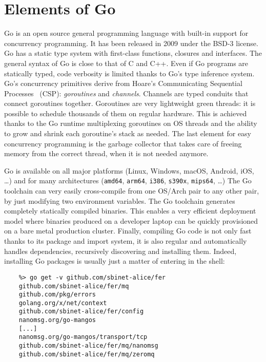 \documentclass{webofc}
\begin{document}
\section{Elements of Go}
\label{sec-intro-go}
Go is an open source general programming language with built-in support for concurrency programming.
It has been released in 2009 under the BSD-3 license.
Go has a static type system with first-class functions, closures and interfaces.
The general syntax of Go is close to that of C and C++.
Even if Go programs are statically typed, code verbosity is limited thanks to Go's type inference system.
Go's concurrency primitives derive from Hoare's Communicating Sequential Processes~\cite{ref-csp} (CSP): \emph{goroutines} and \emph{channels}.
Channels are typed conduits that connect goroutines together.
Goroutines are very lightweight green threads: it is possible to schedule thousands of them on regular hardware.
This is achieved thanks to the Go runtime multiplexing goroutines on OS threads and the ability to grow and shrink each goroutine's stack as needed.
The last element for easy concurrency programming is the garbage collector that takes care of freeing memory from the correct thread, when it is not needed anymore.

Go is available on all major platforms (Linux, Windows, macOS, Android, iOS, \ldots) and for many architectures (\texttt{amd64}, \texttt{arm64}, \texttt{i386}, \texttt{s390x}, \texttt{mips64}, \ldots)
The Go toolchain can very easily cross-compile from one OS/Arch pair to any other pair, by just modifying two environment variables.
The Go toolchain generates completely statically compiled binaries.
This enables a very efficient deployment model where binaries produced on a developer laptop can be quickly provisioned on a bare metal production cluster.
Finally, compiling Go code is not only fast thanks to its package and import system, it is also regular and automatically handles dependencies, recursively discovering and installing them.
Indeed, installing Go packages is usually just a matter of entering in the shell:

\begin{verbatim}
	%> go get -v github.com/sbinet-alice/fer
	github.com/sbinet-alice/fer/mq
	github.com/pkg/errors
	golang.org/x/net/context
	github.com/sbinet-alice/fer/config
	nanomsg.org/go-mangos
	[...]
	nanomsg.org/go-mangos/transport/tcp
	github.com/sbinet-alice/fer/mq/nanomsg
	github.com/sbinet-alice/fer/mq/zeromq
\end{verbatim}
\end{document}
